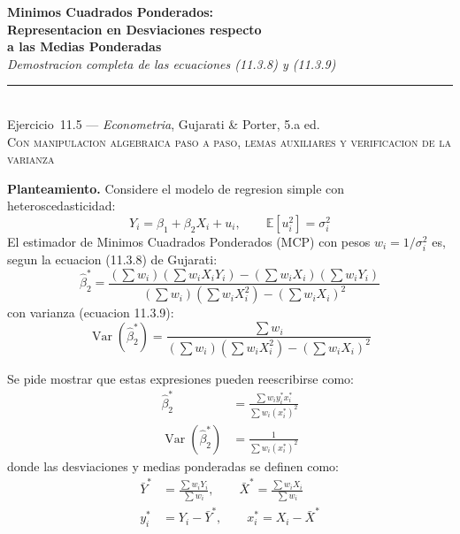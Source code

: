 \documentclass[12pt, letterpaper]{article}
\theoremstyle{remark}
\newcommand{\E}{\mathbb{E}}
\newcommand{\Var}{\operatorname{Var}}
\newcommand{\sw}{\sum w_i}
\newcommand{\swx}{\sum w_i X_i}
\newcommand{\swy}{\sum w_i Y_i}
\newcommand{\swxy}{\sum w_i X_i Y_i}
\newcommand{\swxx}{\sum w_i X_i^2}
\newcommand{\Ybar}{\bar{Y}^*}
\newcommand{\Xbar}{\bar{X}^*}
\newcommand{\ystar}{y_i^*}
\newcommand{\xstar}{x_i^*}
\begin{document}
\begin{center}
  {\LARGE\bfseries Minimos Cuadrados Ponderados:}\\[6pt]
  {\LARGE\bfseries Representacion en Desviaciones respecto}\\[6pt]
  {\LARGE\bfseries a las Medias Ponderadas}\\[12pt]
  {\large\itshape Demostracion completa de las ecuaciones (11.3.8) y (11.3.9)}\\[14pt]
  \rule{0.55\linewidth}{0.6pt}\\[8pt]
  {\normalsize Ejercicio~11.5 --- \textit{Econometria}, Gujarati \& Porter, 5.a ed.}\\[4pt]
  {\small\textsc{Con manipulacion algebraica paso a paso, lemas auxiliares
  y verificacion de la varianza}}
\end{center}

\vspace{10pt}

\noindent\textbf{Planteamiento.}\quad
Considere el modelo de regresion simple con heteroscedasticidad:
\begin{equation}
  Y_i = \beta_1 + \beta_2 X_i + u_i,
  \qquad \E[u_i^2] = \sigma_i^2
  \label{eq:modelo}
\end{equation}
El estimador de Minimos Cuadrados Ponderados (MCP) con pesos $w_i = 1/\sigma_i^2$
es, segun la ecuacion (11.3.8) de Gujarati:
\begin{equation}
  \hat\beta_2^* = \frac{(\sw)(\swxy) - (\swx)(\swy)}{(\sw)(\swxx) - (\swx)^2}
  \label{eq:beta2_original}
\end{equation}
con varianza (ecuacion 11.3.9):
\begin{equation}
  \Var(\hat\beta_2^*) = \frac{\sw}{(\sw)(\swxx) - (\swx)^2}
  \label{eq:var_original}
\end{equation}

Se pide mostrar que estas expresiones pueden reescribirse como:
\begin{align}
  \hat\beta_2^* &= \frac{\sum w_i \ystar \xstar}{\sum w_i (\xstar)^2}
  \label{eq:beta2_nuevo}\\[6pt]
  \Var(\hat\beta_2^*) &= \frac{1}{\sum w_i (\xstar)^2}
  \label{eq:var_nuevo}
\end{align}
donde las desviaciones y medias ponderadas se definen como:
\begin{align}
  \Ybar &= \frac{\swy}{\sw}, \qquad \Xbar = \frac{\swx}{\sw}
  \label{eq:medias_pond}\\[6pt]
  \ystar &= Y_i - \Ybar, \qquad \xstar = X_i - \Xbar
  \label{eq:desviaciones}
\end{align}
\end{document}
